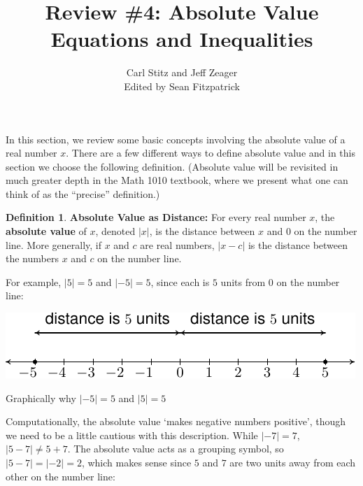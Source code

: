 \documentclass[11pt]{article}
\title{Review \#4: Absolute Value Equations and Inequalities}
\author{Carl Stitz and Jeff Zeager\\
Edited by Sean Fitzpatrick}
\theoremstyle{definition}  %
\newtheorem{defn}{\bf Definition}
\newcommand{\bbm}{\begin{boxedminipage}{6.41in}}
\newcommand{\ebm}{\end{boxedminipage}}
\begin{document}
\maketitle


\renewcommand{\headrulewidth}{0pt}
\renewcommand{\headheight}{14pt}
\lhead[\fancyplain{}{\sc\thepage}]%
      {\fancyplain{}{\sc \nouppercase{\rightmark}}}
\rhead[\fancyplain{}{\sc \nouppercase{\leftmark}}]%
      {\fancyplain{}{\sc\thepage}}
\cfoot{}


In this section, we review some basic concepts involving the absolute value of a real number $x$.  There are a few different ways to define absolute value and in this section we choose the following definition.  (Absolute value will be revisited in much greater depth in the Math 1010 textbook, where we present what one can think of as the ``precise'' definition.)

\medskip

\colorbox{ResultColor}{\bbm

\begin{defn}\label{absvaldistdefn}{\bf Absolute Value as Distance:}  For every real number $x$, the \textbf{absolute value} of $x$, denoted $|x|$, is the distance between $x$ and $0$ on the number line.  More generally, if $x$ and $c$ are real numbers, $|x-c|$ is the distance between the numbers $x$ and $c$ on the number line.

\end{defn}

\ebm}

\medskip

For example, $|5| = 5$ and $|-5| = 5$, since each is $5$ units from $0$ on the number line:

\begin{center}

\includegraphics{AbsValEqIneq-1}

Graphically why $|-5| = 5$ and $|5| = 5$

\end{center}

Computationally, the absolute value `makes negative numbers positive',  though we need to be a little cautious with this description. While $|-7| = 7$, $|5-7| \neq 5+7$.  The absolute value acts as a grouping symbol, so $|5-7| = |-2| = 2$, which makes sense since $5$ and $7$ are two units away from each other on the number line:
\end{document}
